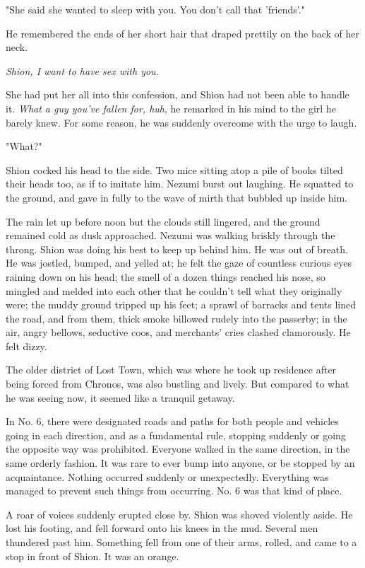 "She said she wanted to sleep with you. You don't call that 'friends'."

He remembered the ends of her short hair that draped prettily on the
back of her neck.

\emph{Shion, I want to have sex with you.}

She had put her all into this confession, and Shion had not been able to
handle it. \emph{What a guy you've fallen for, huh}, he remarked in his mind to
the girl he barely knew. For some reason, he was suddenly overcome with
the urge to laugh.

"What?"

Shion cocked his head to the side. Two mice sitting atop a pile of books
tilted their heads too, as if to imitate him. Nezumi burst out laughing.
He squatted to the ground, and gave in fully to the wave of mirth that
bubbled up inside him.

\mybreak

The rain let up before noon but the clouds still lingered, and the
ground remained cold as dusk approached. Nezumi was walking briskly
through the throng. Shion was doing his best to keep up behind him. He
was out of breath. He was jostled, bumped, and yelled at; he felt the
gaze of countless curious eyes raining down on his head; the smell of a
dozen things reached his nose, so mingled and melded into each other
that he couldn't tell what they originally were; the muddy ground
tripped up his feet; a sprawl of barracks and tents lined the road, and
from them, thick smoke billowed rudely into the passerby; in the air,
angry bellows, seductive coos, and merchants' cries clashed clamorously.
He felt dizzy.

The older district of Lost Town, which was where he took up residence
after being forced from Chronos, was also bustling and lively. But
compared to what he was seeing now, it seemed like a tranquil getaway.

In No. 6, there were designated roads and paths for both people and
vehicles going in each direction, and as a fundamental rule, stopping
suddenly or going the opposite way was prohibited. Everyone walked in
the same direction, in the same orderly fashion. It was rare to ever
bump into anyone, or be stopped by an acquaintance. Nothing occurred
suddenly or unexpectedly. Everything was managed to prevent such things
from occurring. No. 6 was that kind of place.

A roar of voices suddenly erupted close by. Shion was shoved violently
aside. He lost his footing, and fell forward onto his knees in the mud.
Several men thundered past him. Something fell from one of their arms,
rolled, and came to a stop in front of Shion. It was an orange.

